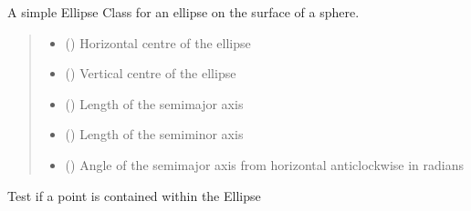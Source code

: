 \documentclass[letterpaper,10pt,english]{sphinxmanual}
\begin{document}
\begin{fulllineitems}
\label{\detokenize{users_guide:GeoSpatialTools.quadtree.Ellipse}}
\pysigstartsignatures
{}
\pysigstopsignatures
\sphinxAtStartPar
A simple Ellipse Class for an ellipse on the surface of a sphere.
\begin{quote}\begin{description}
\begin{itemize}
\item {} 
\sphinxAtStartPar
{} () \textendash{} Horizontal centre of the ellipse

\item {} 
\sphinxAtStartPar
{} () \textendash{} Vertical centre of the ellipse

\item {} 
\sphinxAtStartPar
{} () \textendash{} Length of the semi\sphinxhyphen{}major axis

\item {} 
\sphinxAtStartPar
{} () \textendash{} Length of the semi\sphinxhyphen{}minor axis

\item {} 
\sphinxAtStartPar
{} () \textendash{} Angle of the semi\sphinxhyphen{}major axis from horizontal anti\sphinxhyphen{}clockwise in radians

\end{itemize}

\end{description}\end{quote}

\begin{fulllineitems}
\label{\detokenize{users_guide:GeoSpatialTools.quadtree.Ellipse.contains}}
\pysigstartsignatures
{}
\pysigstopsignatures
\sphinxAtStartPar
Test if a point is contained within the Ellipse
\begin{quote}\begin{description}
\sphinxAtStartPar
{}


\end{description}
\end{quote}
\end{fulllineitems}
\end{fulllineitems}
\end{document}
